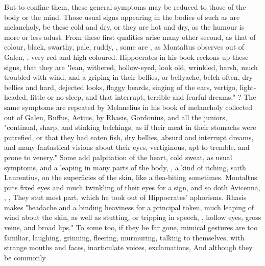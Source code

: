 {But to confine them, these general symptoms may be reduced to those of the body
or the mind. Those usual signs appearing in the bodies of such as are
melancholy, be these cold and dry, or they are hot and dry, as the humour is
more or less adust. From these first qualities arise many
other second, as that of colour, black, swarthy, pale,
ruddy, \etc{}, some are , as Montaltus
 observes out of Galen, , very red and high coloured. Hippocrates in his book
 reckons up
these signs, that they are "lean, withered, hollow-eyed,
look old, wrinkled, harsh, much troubled with wind, and a griping in their
bellies, or bellyache, belch often, dry bellies and hard, dejected looks,
flaggy beards, singing of the ears, vertigo, light-headed, little or no sleep,
and that interrupt, terrible and fearful dreams," ? The same symptoms are repeated by
Melanelius in his book of melancholy collected out of Galen, Ruffus, Aetius, by
Rhasis, Gordonius, and all the juniors, "continual, sharp,
and stinking belchings, as if their meat in their stomachs were putrefied, or
that they had eaten fish, dry bellies, absurd and interrupt dreams, and many
fantastical visions about their eyes, vertiginous, apt to tremble, and prone to
venery." Some add palpitation of the heart, cold sweat, as
usual symptoms, and a leaping in many parts of the body, , a kind of itching, saith Laurentius, on the superficies of
the skin, like a flea-biting sometimes. Montaltus
 puts fixed eyes and much twinkling of their
eyes for a sign, and so doth Avicenna, , \etc{},  They stut most part, which he took out of Hippocrates' aphorisms.
Rhasis makes "headache and a binding heaviness for a
principal token, much leaping of wind about the skin, as well as stutting, or
tripping in speech, \etc{}, hollow eyes, gross veins, and broad lips." To some
too, if they be far gone, mimical gestures are too familiar, laughing,
grinning, fleering, murmuring, talking to themselves, with strange mouths and
faces, inarticulate voices, exclamations, \etc{} And although they be commonly
}
